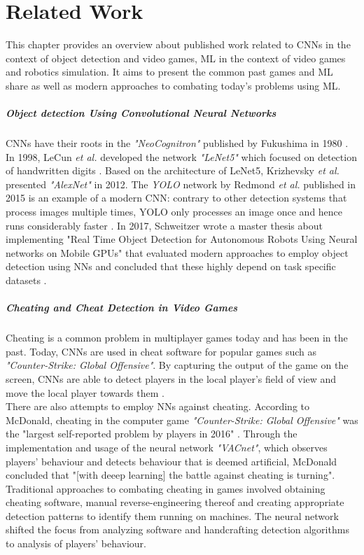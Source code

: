 \chapter{Related Work}

This chapter provides an overview about published work related to \acp{CNN} in the context of object detection and video games, \ac{ML} in the context of video games and robotics simulation. It aims to present the common past games and \ac{ML} share as well as modern approaches to combating today's problems using \ac{ML}.

\paragraph{Object detection Using Convolutional Neural Networks}
\acp{CNN} have their roots in the \emph{"NeoCognitron"} published by Fukushima in 1980 \cite{6313076}. In 1998, LeCun \textit{et al.} developed the network \textit{"LeNet5"} which focused on detection of handwritten digits \cite{Lecun98gradient-basedlearning}. Based on the architecture of LeNet5, Krizhevsky \textit{et al.} presented \emph{"AlexNet"} in 2012. The \emph{\ac{YOLO}} network by Redmond \textit{et al.} published in 2015 is an example of a modern \ac{CNN}: contrary to other detection systems that process images multiple times, \ac{YOLO} only processes an image once and hence runs considerably faster \cite{DBLP:journals/corr/RedmonDGF15}\cite{redmon2016yolo9000}\cite{yolov3}.
In 2017, Schweitzer wrote a master thesis about implementing "Real Time Object Detection for Autonomous Robots Using Neural networks on Mobile GPUs" that evaluated modern approaches to employ object detection using \acp{NN} and concluded that these highly depend on task specific datasets \cite{Schweitzer2017}.

\paragraph{Cheating and Cheat Detection in Video Games}
Cheating is a common problem in multiplayer games today and has been in the past. Today, \acp{CNN} are used in cheat software for popular games such as \textit{"Counter-Strike: Global Offensive"}. By capturing the output of the game on the screen, \acp{CNN} are able to detect players in the local player's field of view and move the local player towards them \cite{Hayha}.\\
There are also attempts to employ \acp{NN} against cheating. According to McDonald, cheating in the computer game \textit{"Counter-Strike: Global Offensive"} was the "largest self-reported problem by players in 2016" \cite{VACnet}. Through the implementation and usage of the neural network \emph{"VACnet"}, which observes players' behaviour and detects behaviour that is deemed artificial, McDonald concluded that "[with deeep learning] the battle against cheating is turning". Traditional approaches to combating cheating in games involved obtaining cheating software, manual reverse-engineering thereof and creating appropriate detection patterns to identify them running on machines. The neural network shifted the focus from analyzing software and handcrafting detection algorithms to analysis of players' behaviour.

